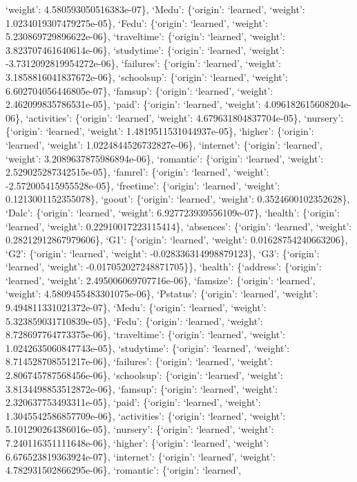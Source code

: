 \documentclass[
]{article}
\begin{document}
`weight': 4.580593050516383e-07\}, `Medu': \{`origin': `learned',
`weight': 1.0234019307479275e-05\}, `Fedu': \{`origin': `learned',
`weight': 5.230869729896622e-06\}, `traveltime': \{`origin': `learned',
`weight': 3.823707461640614e-06\}, `studytime': \{`origin': `learned',
`weight': -3.7312092819954272e-06\}, `failures': \{`origin': `learned',
`weight': 3.1858816041837672e-06\}, `schoolsup': \{`origin': `learned',
`weight': 6.602704056446805e-07\}, `famsup': \{`origin': `learned',
`weight': 2.462099835786531e-05\}, `paid': \{`origin': `learned',
`weight': 4.096182615608204e-06\}, `activities': \{`origin': `learned',
`weight': 4.679631804837704e-05\}, `nursery': \{`origin': `learned',
`weight': 1.4819511531044937e-05\}, `higher': \{`origin': `learned',
`weight': 1.0224844526732827e-06\}, `internet': \{`origin': `learned',
`weight': 3.2089637875986894e-06\}, `romantic': \{`origin': `learned',
`weight': 2.529025287342515e-05\}, `famrel': \{`origin': `learned',
`weight': -2.572005415955528e-05\}, `freetime': \{`origin': `learned',
`weight': 0.1213001152355078\}, `goout': \{`origin': `learned',
`weight': 0.3524600102352628\}, `Dalc': \{`origin': `learned', `weight':
6.927723939556109e-07\}, `health': \{`origin': `learned', `weight':
0.22910017223115414\}, `absences': \{`origin': `learned', `weight':
0.28212912867979606\}, `G1': \{`origin': `learned', `weight':
0.01628754240663206\}, `G2': \{`origin': `learned', `weight':
-0.028336314998879123\}, `G3': \{`origin': `learned', `weight':
-0.017052027248871705\}\}, `health': \{`address': \{`origin': `learned',
`weight': 2.495006069707716e-06\}, `famsize': \{`origin': `learned',
`weight': 4.5809455483301075e-06\}, `Pstatus': \{`origin': `learned',
`weight': 9.494811331021372e-07\}, `Medu': \{`origin': `learned',
`weight': 5.323859031710839e-05\}, `Fedu': \{`origin': `learned',
`weight': 8.728697764773375e-06\}, `traveltime': \{`origin': `learned',
`weight': 1.0242635060847743e-05\}, `studytime': \{`origin': `learned',
`weight': 8.714528708551217e-06\}, `failures': \{`origin': `learned',
`weight': 2.806745787568456e-06\}, `schoolsup': \{`origin': `learned',
`weight': 3.8134498853512872e-06\}, `famsup': \{`origin': `learned',
`weight': 2.320637753493311e-05\}, `paid': \{`origin': `learned',
`weight': 1.3045542586857709e-06\}, `activities': \{`origin': `learned',
`weight': 5.101290264386016e-05\}, `nursery': \{`origin': `learned',
`weight': 7.240116351111648e-06\}, `higher': \{`origin': `learned',
`weight': 6.676523819363924e-07\}, `internet': \{`origin': `learned',
`weight': 4.782931502866295e-06\}, `romantic': \{`origin': `learned',
\end{document}
